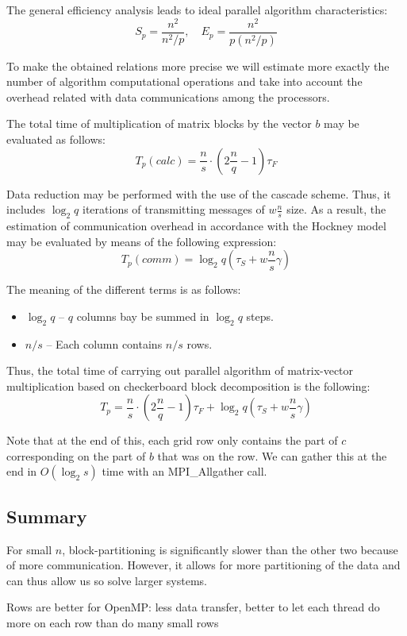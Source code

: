 The general efficiency analysis leads to ideal parallel algorithm characteristics:
\begin{equation}
  S_p = \frac{n^2}{n^2/p}, \quad E_p = \frac{n^2}{p(n^2/p)}
\end{equation}

To make the obtained relations more precise we will estimate more exactly the number of algorithm
computational operations and take into account the overhead related with data communications among the
processors.

The total time of multiplication of matrix blocks by the vector $b$ may be evaluated as follows:
\begin{equation}
  T_p(calc) = \frac{n}{s} \cdot \left( 2 \frac{n}{q} - 1 \right) \tau_F
\end{equation}

Data reduction may be performed with the use of the cascade scheme. Thus, it includes $\log_2 q$ iterations of transmitting messages of $w \frac{n}{s}$ size. As a result, the estimation of communication overhead in accordance with the Hockney model may be evaluated by means of the following expression:
\begin{equation}
  T_p(comm) = \log_2 q \left( \tau_S + w \frac{n}{s} \gamma \right)
\end{equation}

The meaning of the different terms is as follows:
\begin{itemize}\itemsep=0em
  \item $\log_2 q$ -- $q$ columns bay be summed in $\log_2 q$ steps.
  \item $n/s$ -- Each column contains $n/s$ rows.
\end{itemize}

Thus, the total time of carrying out parallel algorithm of matrix-vector multiplication based on checkerboard block
decomposition is the following:
\begin{equation}
  T_p = \frac{n}{s} \cdot \left( 2 \frac{n}{q} - 1 \right) \tau_F + \log_2 q \left( \tau_S + w \frac{n}{s} \gamma \right)
\end{equation}

Note that at the end of this, each grid row only contains the part of $c$ corresponding on the part of $b$ that was on the row. We can gather this at the end in $O(\log_2 s)$ time with an MPI\_Allgather call.




\subsection{Summary} %
\label{sub:summary}
For small $n$, block-partitioning is significantly slower than the other two because of more communication. However, it allows for more partitioning of the data and can thus allow us so solve larger systems.

Rows are better for OpenMP: less data transfer, better to let each thread do more on each row than do many small rows





